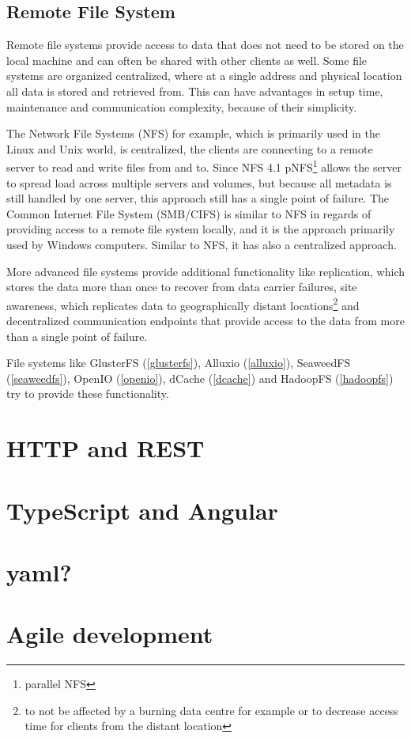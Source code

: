 \subsection{Remote File System}
\label{analysis:storage:organisation}

Remote file systems provide access to data that does not need to be stored on the local machine and can often be shared with other clients as well.
Some file systems are organized centralized, where at a single address and physical location all data is stored and retrieved from.
This can have advantages in setup time, maintenance and communication complexity, because of their simplicity.

The Network File Systems (NFS) for example, which is primarily used in the Linux and Unix world, is centralized, the clients are connecting to a remote server to read and write files from and to.
Since NFS 4.1 pNFS\footnote{parallel NFS}\cite[p. 14, section 1.7.2.2]{nfs:pnfs} allows the server to spread load across multiple servers and volumes, but because all metadata is still handled by one server, this approach still has a single point of failure.
The Common Internet File System (SMB/CIFS) is similar to NFS in regards of providing access to a remote file system locally, and it is the approach primarily used by Windows computers.
Similar to NFS, it has also a centralized approach.


More advanced file systems provide additional functionality like replication, which stores the data more than once to recover from data carrier failures, site awareness, which replicates data to geographically distant locations\footnote{to not be affected by a burning data centre for example or to decrease access time for clients from the distant location} and decentralized communication endpoints that provide access to the data from more than a single point of failure.


File systems like GlusterFS (\autoref{glusterfs}), Alluxio (\autoref{alluxio}), SeaweedFS (\autoref{seaweedfs}), OpenIO (\autoref{openio}), dCache (\autoref{dcache}) and HadoopFS (\autoref{hadoopfs}) try to provide these functionality.

\section{HTTP and REST}

\section{TypeScript and Angular}


\section{yaml?}


\section{Agile development}
